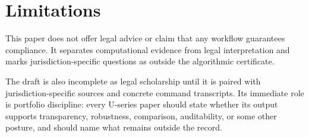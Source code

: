 \section{Limitations}

This paper does not offer legal advice or claim that any workflow guarantees
compliance. It separates computational evidence from legal interpretation and
marks jurisdiction-specific questions as outside the algorithmic certificate.

The draft is also incomplete as legal scholarship until it is paired with
jurisdiction-specific sources and concrete command transcripts. Its immediate
role is portfolio discipline: every U-series paper should state whether its
output supports transparency, robustness, comparison, auditability, or some
other posture, and should name what remains outside the record.
